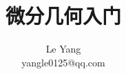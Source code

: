 \documentclass[UTF8]{ctexbook}
\begin{document}
\title{微分几何入门}
\author{
	Le Yang\\
	yangle0125@qq.com
}
\date{}
\maketitle

\tableofcontents







\end{document}
